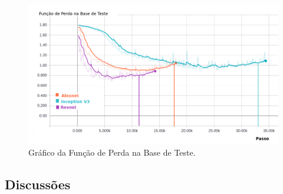 \begin{figure}
\centering
\includegraphics[scale=0.5]{figuras/loss-val.png}
\caption{Gráfico da Função de Perda na Base de Teste.}
\label{fig:loss-val}
\end{figure}


\subsection{Discussões}




